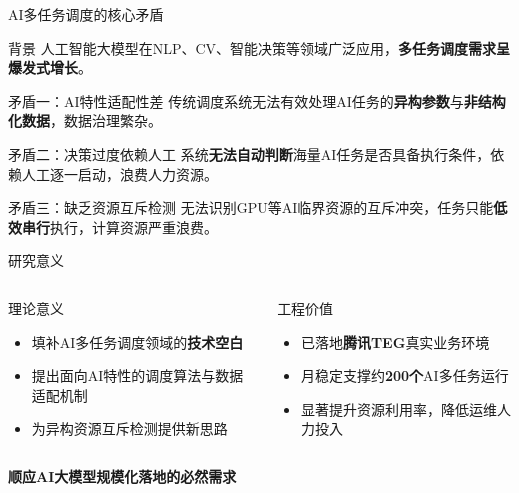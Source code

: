 \documentclass[aspectratio=169,UTF8,xcolor=table]{ctexbeamer}
\begin{document}
\begin{frame}{AI多任务调度的核心矛盾}
  \begin{block}{背景}
    人工智能大模型在NLP、CV、智能决策等领域广泛应用，\textbf{多任务调度需求呈爆发式增长}。
  \end{block}

  \begin{alertblock}{矛盾一：AI特性适配性差}
    传统调度系统无法有效处理AI任务的\textbf{异构参数}与\textbf{非结构化数据}，数据治理繁杂。
  \end{alertblock}

  \begin{alertblock}{矛盾二：决策过度依赖人工}
    系统\textbf{无法自动判断}海量AI任务是否具备执行条件，依赖人工逐一启动，浪费人力资源。
  \end{alertblock}

  \begin{alertblock}{矛盾三：缺乏资源互斥检测}
    无法识别GPU等AI临界资源的互斥冲突，任务只能\textbf{低效串行}执行，计算资源严重浪费。
  \end{alertblock}
\end{frame}

\begin{frame}{研究意义}
  \begin{columns}[T]
    \begin{block}{理论意义}
      \begin{itemize}
        \item 填补AI多任务调度领域的\textbf{技术空白}
        \item 提出面向AI特性的调度算法与数据适配机制
        \item 为异构资源互斥检测提供新思路
      \end{itemize}
    \end{block}

    \begin{block}{工程价值}
      \begin{itemize}
        \item 已落地\textbf{腾讯TEG}真实业务环境
        \item 月稳定支撑约\textbf{200个}AI多任务运行
        \item 显著提升资源利用率，降低运维人力投入
      \end{itemize}
    \end{block}
  \end{columns}

  \vspace{0.5cm}
  \begin{center}
    \textbf{顺应AI大模型规模化落地的必然需求}
  \end{center}
\end{frame}
\end{document}
